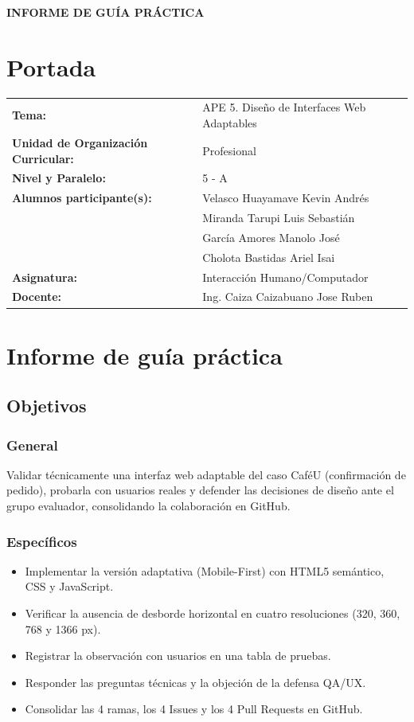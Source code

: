 \documentclass{article}
\begin{document}
\begin{center}
    {\large \textbf{INFORME DE GUÍA PRÁCTICA}} \\
\end{center}

\section{Portada}
\begin{flushleft}
\begin{tabular}{ l p{8cm} }
    \textbf{Tema:} & APE 5. Diseño de Interfaces Web Adaptables \\
    \textbf{Unidad de Organización Curricular:} & Profesional \\
    \textbf{Nivel y Paralelo:} & 5 - A \\
    \textbf{Alumnos participante(s):} & Velasco Huayamave Kevin Andrés \\& Miranda Tarupi Luis Sebastián \\ & García Amores Manolo José \\& Cholota Bastidas Ariel Isai \\
    \textbf{Asignatura:} & Interacción Humano/Computador \\
    \textbf{Docente:} & Ing. Caiza Caizabuano Jose Ruben \\
\end{tabular}
\end{flushleft}

\section{Informe de guía práctica}
\subsection{Objetivos}
\subsubsection{General}
Validar técnicamente una interfaz web adaptable del caso CaféU (confirmación de pedido), probarla con usuarios reales y defender las decisiones de diseño ante el grupo evaluador, consolidando la colaboración en GitHub.

\subsubsection{Específicos}
\begin{itemize}
    \item Implementar la versión adaptativa (Mobile-First) con HTML5 semántico, CSS y JavaScript.
    \item Verificar la ausencia de desborde horizontal en cuatro resoluciones (320, 360, 768 y 1366 px).
    \item Registrar la observación con usuarios en una tabla de pruebas.
    \item Responder las preguntas técnicas y la objeción de la defensa QA/UX.
    \item Consolidar las 4 ramas, los 4 Issues y los 4 Pull Requests en GitHub.
\end{itemize}
\end{document}
